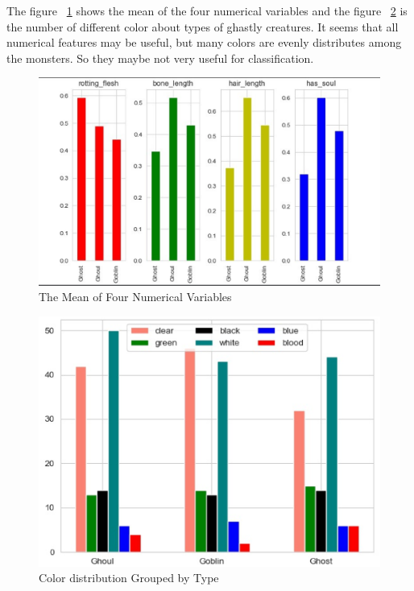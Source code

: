 The figure ~\cref{fig:his_1} 
shows the mean of the four numerical variables  
and the figure ~\cref{fig:his_2} 
is the number of different color 
about types of ghastly creatures.
It seems that all numerical features may be useful, 
but many colors are evenly distributes among the monsters. 
So they maybe not very useful for classification.


\begin{figure}[htbp]
	\centering
	\label{fig:his_1}
	\includegraphics[scale=0.3]{figures/his_1.eps}
	\caption{The Mean of Four Numerical Variables}
\end{figure}


\begin{figure}[htbp]
	\centering
	\label{fig:his_2}
	\includegraphics[scale=0.3]{figures/his_2.eps}
	\caption{Color distribution Grouped by Type}
\end{figure}


